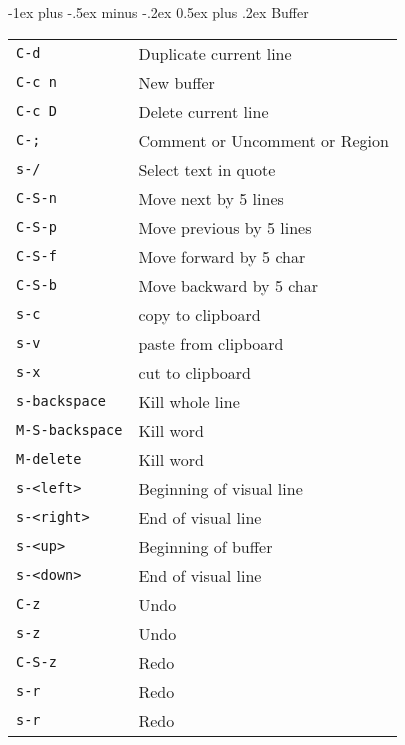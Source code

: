 \documentclass[10pt,landscape]{article}
\makeatletter
\renewcommand{\section}{\@startsection{section}{1}{0mm}%
                                {-1ex plus -.5ex minus -.2ex}%
                                {0.5ex plus .2ex}%
                                {\normalfont\large\bfseries}}
\makeatother
\begin{document}
\raggedright
\footnotesize
\begin{multicols}{3}


\setlength{\premulticols}{1pt}
\setlength{\postmulticols}{1pt}
\setlength{\multicolsep}{1pt}
\setlength{\columnsep}{2pt}


\section{Buffer}
\begin{tabular}{@{}ll@{}}
\verb!C-d!    & Duplicate current line \\
\verb!C-c n!    & New buffer \\
\verb!C-c D!    & Delete current line \\
\verb!C-;!    & Comment or Uncomment or Region \\
\verb!s-/!    & Select text in quote \\
\verb!C-S-n!    & Move next by 5 lines \\
\verb!C-S-p!    & Move previous by 5 lines \\
\verb!C-S-f!    & Move forward by 5 char \\
\verb!C-S-b!    & Move backward by 5 char \\
\verb!s-c!      & copy to clipboard \\
\verb!s-v!      & paste from clipboard \\
\verb!s-x!      & cut to clipboard \\
\verb!s-backspace!      & Kill whole line \\
\verb!M-S-backspace!    & Kill word \\
\verb!M-delete!          & Kill word \\
\verb!s-<left>!      & Beginning of visual line \\
\verb!s-<right>!     & End of visual line \\
\verb!s-<up>!        & Beginning of buffer \\
\verb!s-<down>!      & End of visual line \\
\verb!C-z!      & Undo \\
\verb!s-z!      & Undo \\
\verb!C-S-z!    & Redo \\
\verb!s-r!      & Redo \\
\verb!s-r!      & Redo
\end{tabular}


\end{multicols}
\end{document}
